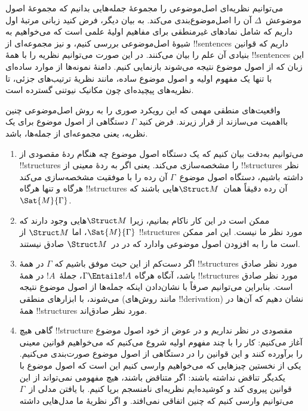 \documentclass[../../../include/open-logic-section]{subfiles}
\begin{document}
\begin{explain}
می‌توانیم نظریه‌ای اصل‌موضوعی را مجموعهٔ جمله‌هایی بدانیم که
مجموعهٔ اصول موضوعش~$\Delta$ آن را اصل‌موضوع‌بندی می‌کند. به بیان دیگر،
فرض کنید زبانی مرتبهٔ اول داریم که شامل نمادهای غیرمنطقی برای مفاهیم
اولیهٔ علمی است که می‌خواهیم به شیوهٔ اصل‌موضوعی بررسی کنیم، و نیز
مجموعه‌ای از !!{sentence}s داریم که قوانین بنیادی آن علم را بیان
می‌کنند. در این صورت می‌توانیم نظریه را با همهٔ !!{sentence}s این زبان
که از اصول موضوع نتیجه می‌شوند بازنمایی کنیم. دامنهٔ نمونه‌ها از موارد
ساده‌ای با تنها یک مفهوم اولیه و اصول موضوع ساده، مانند نظریهٔ
ترتیب‌های جزئی، تا نظریه‌های پیچیده‌ای چون مکانیک نیوتنی گسترده است.

واقعیت‌های منطقی مهمی که این رویکرد صوری را به روش اصل‌موضوعی چنین
بااهمیت می‌سازند از قرار زیرند. فرض کنید $\Gamma$ دستگاهی از اصول موضوع
برای یک نظریه، یعنی مجموعه‌ای از جمله‌ها، باشد.
\begin{enumerate}
\item می‌توانیم به‌دقت بیان کنیم که یک دستگاه اصول موضوع چه هنگام ردهٔ
  مقصودی از !!{structure}s را مشخصه‌سازی می‌کند. یعنی اگر به ردهٔ معینی
  از !!{structure}s نظر داشته باشیم، دستگاه اصول موضوع~$\Gamma$ آن رده
  را با موفقیت مشخصه‌سازی می‌کند هرگاه و تنها هرگاه !!{structure}s آن
  رده دقیقاً همان~$\Struct M$هایی باشند که $\Sat{M}{\Gamma}$.
\item ممکن است در این کار ناکام بمانیم، زیرا $\Struct M$هایی وجود دارند
  که $\Sat{M}{\Gamma}$، اما $\Struct M$ از !!{structure}s مورد نظر ما
  نیست. این امر ممکن است ما را به افزودن اصول موضوعی وادارد که در
  در~$\Struct M$ صادق نیستند.
\item اگر دست‌کم از این حیث موفق باشیم که $\Gamma$ در همهٔ
  !!{structure}s مورد نظر صادق باشد، آنگاه هرگاه $\Gamma \Entails !A$،
  جملهٔ~$!A$ در همهٔ !!{structure}s مورد نظر صادق است. بنابراین
  می‌توانیم صرفاً با نشان‌دادن اینکه جمله‌ها از اصول موضوع نتیجه
  می‌شوند، با ابزارهای منطقی (مانند روش‌های !!{derivation}) نشان دهیم
  که آن‌ها در همهٔ !!{structure}s مورد نظر صادق‌اند.
\item گاهی هیچ !!{structure} مقصودی در نظر نداریم و در عوض از خود اصول
  موضوع آغاز می‌کنیم: کار را با چند مفهوم اولیه شروع می‌کنیم که
  می‌خواهیم قوانین معینی را برآورده کنند و این قوانین را در دستگاهی از
  اصول موضوع صورت‌بندی می‌کنیم. یکی از نخستین چیزهایی که می‌خواهیم
  وارسی کنیم این است که اصول موضوع با یکدیگر تناقض نداشته باشند: اگر
  متناقض باشند، هیچ مفهومی نمی‌تواند از این قوانین پیروی کند و کوشیده‌ایم
  نظریه‌ای نامنسجم برپا کنیم. با یافتن مدلی از~$\Gamma$ می‌توانیم
  وارسی کنیم که چنین اتفاقی نمی‌افتد. و اگر نظریهٔ ما مدل‌هایی داشته

\end{enumerate}
\end{explain}
\end{document}

